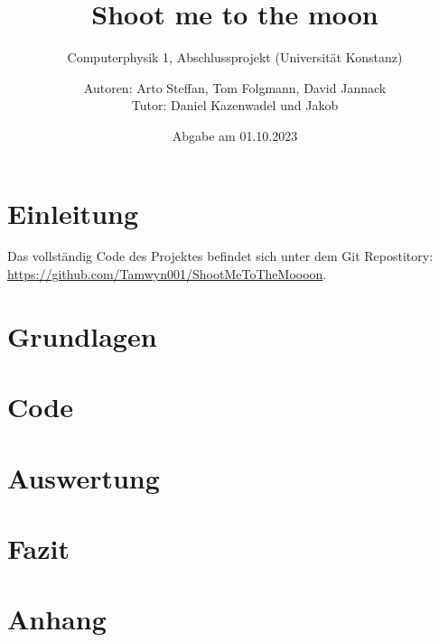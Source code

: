 \documentclass[
    oneside, 
    footinclude=off, 
    captions=tableheading, 
    DIV=12;usenames,
    dvipsnames
]{scrartcl}
\begin{document}
    \title{Shoot me to the moon}
    \subtitle{Computerphysik 1, Abschlussprojekt (Universität Konstanz)}
    \author{Autoren: Arto Steffan, Tom Folgmann, David Jannack \\ \large{Tutor: Daniel Kazenwadel und Jakob }}
    \date{Abgabe am 01.10.2023}
    \maketitle
    \thispagestyle{empty}
    \section*{Einleitung}
        

    \newpage


    \tableofcontents
    \thispagestyle{empty}	
    \newpage
    \setcounter{page}{1}
Das vollständig Code des Projektes befindet sich unter dem Git Repostitory: \url{https://github.com/Tamwyn001/ShootMeToTheMoooon}.


\newpage
\section{Grundlagen}
    
	

\newpage
\section{Code}
    

\newpage
\section{Auswertung}
    

\newpage
\section{Fazit}
    \newpage

\section{Anhang}
    \newpage


\newpage
    
\newpage
    \listoffigures
    \listoftables


%
\end{document}
